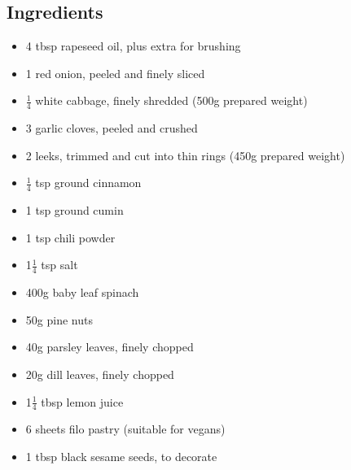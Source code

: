 \documentclass{book}
\begin{document}
\subsection*{Ingredients}
\begin{itemize}
\item 4 tbsp rapeseed oil, plus extra for brushing
\item 1 red onion, peeled and finely sliced
\item $\frac{1}{4}$ white cabbage, finely shredded (500g prepared weight)
\item 3 garlic cloves, peeled and crushed
\item 2 leeks, trimmed and cut into thin rings (450g prepared weight)
\item $\frac{1}{4}$ tsp ground cinnamon
\item 1 tsp ground cumin
\item 1 tsp chili powder
\item 1$\frac{1}{4}$ tsp salt
\item 400g baby leaf spinach
\item 50g pine nuts
\item 40g parsley leaves, finely chopped
\item 20g dill leaves, finely chopped
\item 1$\frac{1}{4}$ tbsp lemon juice
\item 6 sheets filo pastry (suitable for vegans)
\item 1 tbsp black sesame seeds, to decorate
\end{itemize}
\end{document}
